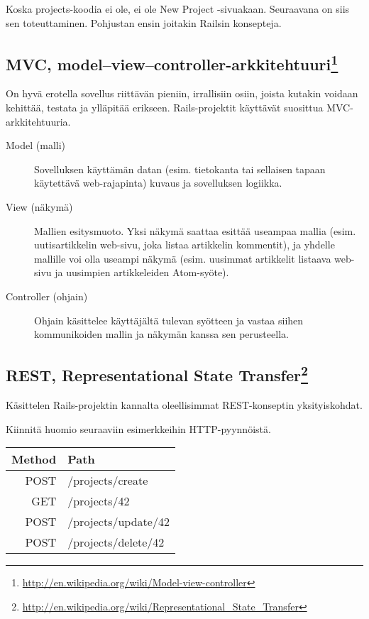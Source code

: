 \documentclass{article}
\newenvironment{english}{\begin{otherlanguage}{english}}{\end{otherlanguage}}
\begin{document}
Koska projects-koodia ei ole, ei ole New Project -sivuakaan. Seuraavana on siis
sen toteuttaminen. Pohjustan ensin joitakin Railsin konsepteja.

\subsection[MVC, model--view--controller-arkkitehtuuri]{MVC,
model--view--controller-arkkitehtuuri\footnote{\url{http://en.wikipedia.org/wiki/Model-view-controller}}}

On hyvä erotella sovellus riittävän pieniin, irrallisiin osiin, joista kutakin
voidaan kehittää, testata ja ylläpitää erikseen. Rails-projektit käyttävät
suosittua MVC-arkkitehtuuria.

\begin{description}
\item[Model (malli)]
Sovelluksen käyttämän datan (esim. tietokanta tai sellaisen tapaan käytettävä
web-rajapinta) kuvaus ja sovelluksen logiikka.

\item[View (näkymä)]
Mallien esitysmuoto. Yksi näkymä saattaa esittää useampaa mallia (esim.
uutisartikkelin web-sivu, joka listaa artikkelin kommentit), ja yhdelle
mallille voi olla useampi näkymä (esim. uusimmat artikkelit listaava web-sivu
ja uusimpien artikkeleiden Atom-syöte).

\item[Controller (ohjain)]
Ohjain käsittelee käyttäjältä tulevan syötteen ja vastaa siihen kommunikoiden
mallin ja näkymän kanssa sen perusteella.
\end{description}

\subsection[REST, Representational State Transfer]{REST, Representational State
Transfer\footnote{\url{http://en.wikipedia.org/wiki/Representational\_State\_Transfer}}}

Käsittelen Rails-projektin kannalta oleellisimmat REST-konseptin
yksityiskohdat.

\begin{samepage}
Kiinnitä huomio seuraaviin esimerkkeihin HTTP-pyynnöistä.

\begin{english}
\begin{tabular}{|r|l|}
\hline
Method & Path                \\
\hline
POST   & /projects/create    \\
GET    & /projects/42        \\
POST   & /projects/update/42 \\
POST   & /projects/delete/42 \\
\hline
\end{tabular}
\end{english}
\end{samepage}
\end{document}
